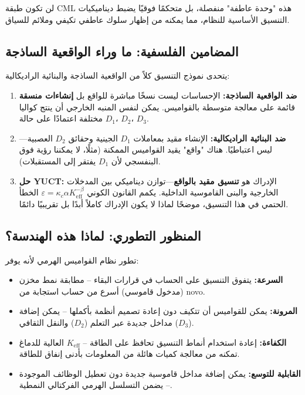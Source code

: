 \documentclass[12pt,a4paper]{article}
\newcommand{\eff}{\mathrm{eff}}
\newcommand{\Ke}{K_{\eff}}
\begin{document}
	لن تكون طبقة CML هذه "وحدة عاطفة" منفصلة، بل متحكمًا فوقيًا يضبط ديناميكيات التنسيق الأساسية للنظام، مما يمكنه من إظهار سلوك عاطفي تكيفي وملائم للسياق.
	
	\subsection{المضامين الفلسفية: ما وراء الواقعية الساذجة}
	
	يتحدى نموذج التنسيق كلاً من الواقعية الساذجة والبنائية الراديكالية:
	
	\begin{enumerate}
		\item \textbf{ضد الواقعية الساذجة:} الإحساسات ليست نسخًا مباشرة للواقع بل \textbf{إنشاءات منسقة} قائمة على معالجة متوسطة بالقواميس. يمكن لنفس المنبه الخارجي أن ينتج كواليا مختلفة اعتمادًا على حالة \(D_1\)، \(D_2\)، \(D_3\).
		
		\item \textbf{ضد البنائية الراديكالية:} الإنشاء مقيد بمعاملات \(D_1\) الجينية وحقائق \(D_2\) العصبية—ليس اعتباطيًا. هناك "واقع" يقيد القواميس الممكنة (مثلًا، لا يمكننا رؤية فوق البنفسجي لأن \(D_1\) يفتقر إلى المستقبلات).
		
		\item \textbf{حل YUCT:} الإدراك هو \textbf{تنسيق مقيد بالواقع}—توازن ديناميكي بين المدخلات الخارجية والبنى القاموسية الداخلية. يكمم القانون الكوني \(\varepsilon = \kappa_c \alpha \Ke^{-\beta}\) الخطأ الحتمي في هذا التنسيق، موضحًا لماذا لا يكون الإدراك كاملاً أبدًا بل تقريبيًا دائمًا.
	\end{enumerate}
	
	\subsection{المنظور التطوري: لماذا هذه الهندسة؟}
	
	تطور نظام القواميس الهرمي لأنه يوفر:
	
	\begin{itemize}
		\item \textbf{السرعة:} يتفوق التنسيق على الحساب في قرارات البقاء – مطابقة نمط مخزن (مدخول قاموسي) أسرع من حساب استجابة من novo.
		\item \textbf{المرونة:} يمكن للقواميس أن تتكيف دون إعادة تصميم أنظمة بأكملها – يمكن إضافة مداخل جديدة عبر التعلم (\(D_2\)) والنقل الثقافي (\(D_3\)).
		\item \textbf{الكفاءة:} إعادة استخدام أنماط التنسيق تحافظ على الطاقة – \(\Ke\) العالية للدماغ تمكنه من معالجة كميات هائلة من المعلومات بأدنى إنفاق للطاقة.
		\item \textbf{القابلية للتوسع:} يمكن إضافة مداخل قاموسية جديدة دون تعطيل الوظائف الموجودة – يضمن التسلسل الهرمي الفركتالي النمطية.
	\end{itemize}
	
\end{document}
